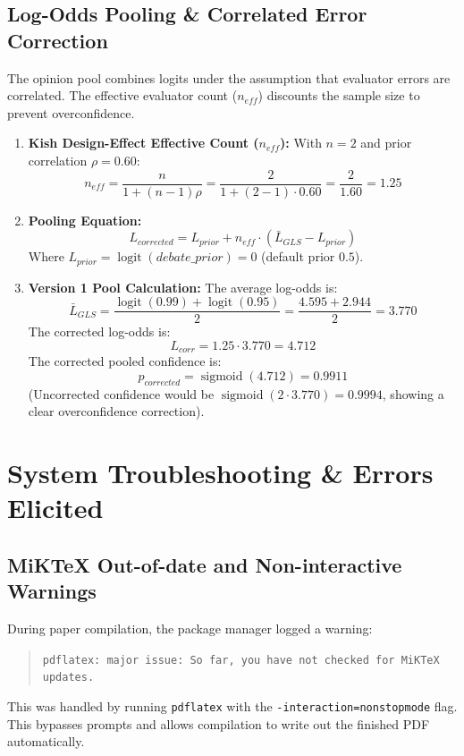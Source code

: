 \documentclass[11pt]{article}
\begin{document}
\subsection{Log-Odds Pooling \& Correlated Error Correction}
The opinion pool combines logits under the assumption that evaluator errors are correlated. The effective evaluator count ($n_{eff}$) discounts the sample size to prevent overconfidence.

\begin{enumerate}
    \item \textbf{Kish Design-Effect Effective Count ($n_{eff}$):}
    With $n = 2$ and prior correlation $\rho = 0.60$:
    \begin{equation}
    n_{eff} = \frac{n}{1 + (n - 1)\rho} = \frac{2}{1 + (2 - 1) \cdot 0.60} = \frac{2}{1.60} = 1.25
    \end{equation}
    \item \textbf{Pooling Equation:}
    \begin{equation}
    L_{corrected} = L_{prior} + n_{eff} \cdot (\bar{L}_{GLS} - L_{prior})
    \end{equation}
    Where $L_{prior} = \operatorname{logit}(debate\_prior) = 0$ (default prior $0.5$).
    \item \textbf{Version 1 Pool Calculation:}
    The average log-odds is:
    \[ \bar{L}_{GLS} = \frac{\operatorname{logit}(0.99) + \operatorname{logit}(0.95)}{2} = \frac{4.595 + 2.944}{2} = 3.770 \]
    The corrected log-odds is:
    \[ L_{corr} = 1.25 \cdot 3.770 = 4.712 \]
    The corrected pooled confidence is:
    \[ p_{corrected} = \operatorname{sigmoid}(4.712) = 0.9911 \]
    (Uncorrected confidence would be $\operatorname{sigmoid}(2 \cdot 3.770) = 0.9994$, showing a clear overconfidence correction).
\end{enumerate}

\newpage

\section{System Troubleshooting \& Errors Elicited}

\subsection{MiKTeX Out-of-date and Non-interactive Warnings}
During paper compilation, the package manager logged a warning:
\begin{quote}
\texttt{pdflatex: major issue: So far, you have not checked for MiKTeX updates.}
\end{quote}
This was handled by running \texttt{pdflatex} with the \texttt{-interaction=nonstopmode} flag. This bypasses prompts and allows compilation to write out the finished PDF automatically.
\end{document}
